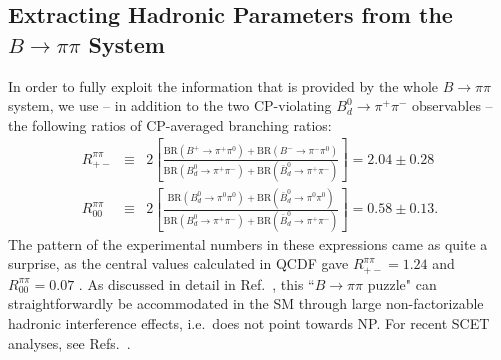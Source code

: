 \documentclass[12pt]{article}
\begin{document}
\subsection{Extracting Hadronic Parameters from the $B\to\pi\pi$ 
System}\label{ssec:Bpipi-hadr}
\unboldmath
%
%
%
In order to fully exploit the information that is provided by the whole $B\to\pi\pi$ 
system, we use -- in addition to the two CP-violating $B^0_d\to\pi^+\pi^-$
observables  -- the following ratios of CP-averaged branching ratios:
\begin{eqnarray}
R_{+-}^{\pi\pi}&\equiv&2\left[\frac{\mbox{BR}(B^+\to\pi^+\pi^0)
+\mbox{BR}(B^-\to\pi^-\pi^0)}{\mbox{BR}(B_d^0\to\pi^+\pi^-)
+\mbox{BR}(\bar B_d^0\to\pi^+\pi^-)}\right]%
=2.04\pm0.28
\label{Rpm-def}\\
R_{00}^{\pi\pi}&\equiv&2\left[\frac{\mbox{BR}(B_d^0\to\pi^0\pi^0)+
\mbox{BR}(\bar B_d^0\to\pi^0\pi^0)}{\mbox{BR}(B_d^0\to\pi^+\pi^-)+
\mbox{BR}(\bar B_d^0\to\pi^+\pi^-)}\right]%
=0.58\pm0.13.
\end{eqnarray}
The pattern of the experimental numbers in these expressions came as quite 
a surprise, as the central values calculated in QCDF gave 
$R_{+-}^{\pi\pi}=1.24$ and $R_{00}^{\pi\pi}=0.07$ \cite{BeNe}. As discussed in 
detail in Ref.~\cite{BFRS3}, this ``$B\to\pi\pi$ puzzle" can straightforwardly be 
accommodated 
in the SM through large non-factorizable hadronic interference effects, i.e.\ 
does not point towards NP. For recent SCET analyses, 
see Refs.~\cite{SCET-Bdpi0K0,BPRS,FeHu}. 
\end{document}
